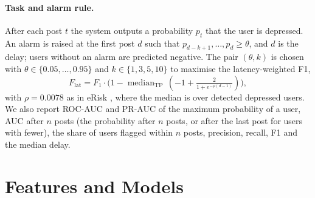 \documentclass[11pt]{article}
\begin{document}
\paragraph{Task and alarm rule.}
After each post $t$ the system outputs a probability $p_t$ that the user is depressed.
An alarm is raised at the first post $d$ such that $p_{d-k+1},\dots,p_d\ge\theta$, and $d$ is the delay; users without an alarm are predicted negative.
The pair $(\theta,k)$ is chosen with $\theta\in\{0.05,\dots,0.95\}$ and $k\in\{1,3,5,10\}$ to maximise the latency-weighted F1,
\begin{equation*}
F_{\mathrm{lat}} = F_1\cdot\bigl(1-\operatorname{median}_{\text{TP}}\,(-1+\tfrac{2}{1+e^{-\rho (d-1)}})\bigr),
\end{equation*}
with $\rho=0.0078$ as in eRisk \citep{sadeque2018measuring}, where the median is over detected depressed users.
We also report ROC-AUC and PR-AUC of the maximum probability of a user, AUC after $n$ posts (the probability after $n$ posts, or after the last post for users with fewer), the share of users flagged within $n$ posts, precision, recall, F1 and the median delay.

\section{Features and Models}
\end{document}
